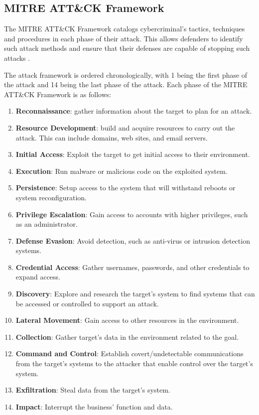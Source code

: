 \begin{fullwidth}
\section{MITRE ATT\&CK Framework}
\label{sec:MITRE Attack Framework}
The MITRE ATT\&CK Framework catalogs cybercriminal's tactics, techniques and procedures in each phase of their attack. This allows defenders to identify such attack methods and ensure that their defenses are capable of stopping such attacks \autocite{IBM}.

The attack framework is ordered chronologically, with 1 being the first phase of the attack and 14 being the last phase of the attack. Each phase of the MITRE ATT\&CK Framework is as follows:

\begin{enumerate}
    \item \textbf{Reconnaissance}: gather information about the target to plan for an attack.
    \item \textbf{Resource Development}: build and acquire resources to carry out the attack. This can include domains, web sites, and email servers.
    \item \textbf{Initial Access}: Exploit the target to get initial access to their environment.
    \item \textbf{Execution}: Run malware or malicious code on the exploited system.
    \item \textbf{Persistence}: Setup access to the system that will withstand reboots or system reconfiguration.
    \item \textbf{Privilege Escalation}: Gain access to accounts with higher privileges, such as an administrator.
    \item \textbf{Defense Evasion}: Avoid detection, such as anti-virus or intrusion detection systems.
    \item \textbf{Credential Access}: Gather usernames, passwords, and other credentials to expand access.
    \item \textbf{Discovery}: Explore and research the target's system to find systems that can be accessed or controlled to support an attack.
    \item \textbf{Lateral Movement}: Gain access to other resources in the environment.
    \item \textbf{Collection}: Gather target's data in the environment related to the goal.
    \item \textbf{Command and Control}: Establish covert/undetectable communications from the target's systems to the attacker that enable control over the target's system.
    \item \textbf{Exfiltration}: Steal data from the target's system.
    \item \textbf{Impact}: Interrupt the business' function and data.
\end{enumerate}
\end{fullwidth}